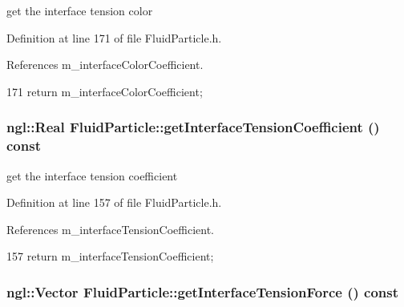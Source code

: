 get the interface tension color 



Definition at line 171 of file FluidParticle.h.



References m\_\-interfaceColorCoefficient.




\begin{DoxyCode}
171 { return m_interfaceColorCoefficient; }
\end{DoxyCode}


\hypertarget{class_fluid_particle_a2487accd86633f52afa8652a9d7b838e}{
\subsubsection[{getInterfaceTensionCoefficient}]{\setlength{\rightskip}{0pt plus 5cm}ngl::Real FluidParticle::getInterfaceTensionCoefficient () const}}
\label{class_fluid_particle_a2487accd86633f52afa8652a9d7b838e}


get the interface tension coefficient 



Definition at line 157 of file FluidParticle.h.



References m\_\-interfaceTensionCoefficient.




\begin{DoxyCode}
157 { return m_interfaceTensionCoefficient; }
\end{DoxyCode}


\hypertarget{class_fluid_particle_a87969914565f0dfe9885f2788ced39b7}{
\subsubsection[{getInterfaceTensionForce}]{\setlength{\rightskip}{0pt plus 5cm}ngl::Vector FluidParticle::getInterfaceTensionForce () const}}
\label{class_fluid_particle_a87969914565f0dfe9885f2788ced39b7}


